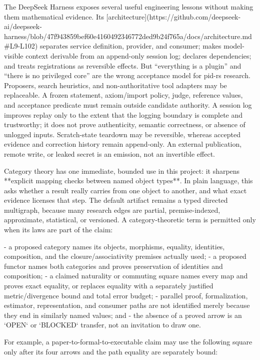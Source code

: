 \documentclass[11pt]{article}
\begin{document}
\begin{markdown}
The DeepSeek Harness exposes several useful engineering lessons without making them mathematical
evidence. Its
[architecture](https://github.com/deepseek-ai/deepseek-harness/blob/47f943859bef60e4160492346772ded9b24f765a/docs/architecture.md#L9-L102)
separates service definition, provider, and consumer; makes model-visible context derivable from an
append-only session log; declares dependencies; and treats registrations as reversible effects.
But “everything is a plugin” and “there is no privileged core” are the wrong acceptance model for
pid-rs research. Proposers, search heuristics, and non-authoritative tool adapters may be
replaceable. A frozen statement, axiom/import policy, judge, reference values, and acceptance
predicate must remain outside candidate authority. A session log improves replay only to the
extent that the logging boundary is complete and trustworthy; it does not prove authenticity,
semantic correctness, or absence of unlogged inputs. Scratch-state teardown may be reversible,
whereas accepted evidence and correction history remain append-only. An external publication,
remote write, or leaked secret is an emission, not an invertible effect.

Category theory has one immediate, bounded use in this project: it sharpens **explicit mapping
checks between named object types**. In plain language, this asks whether a result really carries
from one object to another, and what exact evidence licenses that step. The default artifact remains
a typed directed multigraph, because many research
edges are partial, premise-indexed, approximate, statistical, or versioned. A category-theoretic
term is permitted only when its laws are part of the claim:

- a proposed category names its objects, morphisms, equality, identities, composition, and the
  closure/associativity premises actually used;
- a proposed functor names both categories and proves preservation of identities and composition;
- a claimed naturality or commuting square names every map and proves exact equality, or replaces
  equality with a separately justified metric/divergence bound and total error budget;
- parallel proof, formalization, estimator, representation, and consumer paths are not identified
  merely because they end in similarly named values; and
- the absence of a proved arrow is an `OPEN` or `BLOCKED` transfer, not an invitation to draw one.

For example, a paper-to-formal-to-executable claim may use the following square only after its four
arrows and the path equality are separately bound:


\end{markdown}
\end{document}
